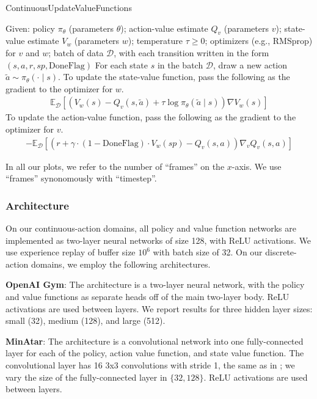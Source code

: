 \documentclass[twoside,11pt]{article}
\newcommand{\Ex}{\mathbb{E}}
\begin{document}
\begin{algorithm}
\caption{ContinuousUpdateValueFunctions}
\label{alg:continuous-value-update}
\begin{algorithmic}
    \State Given: policy $\pi_\theta$ (parameters $\theta$); action-value estimate $Q_v$ (parameters $v$); state-value estimate $V_w$ (parameters $w$); temperature $\tau \geq 0$; optimizers (e.g., RMSprop) for $v$ and $w$; batch of data $\mathcal{D}$, with each transition written in the form $(s, a, r, sp, \text{DoneFlag})$
    \State For each state $s$ in the batch $\mathcal{D}$, draw a new action $\tilde{a} \sim \pi_\theta(\cdot \mid s)$.
    \State To update the state-value function, pass the following as the gradient to the optimizer for $w$. 
    \begin{align*}
        \Ex_{\mathcal{D}}[(V_w(s) - Q_v(s, \tilde{a}) + \tau \log \pi_\theta (\tilde{a} \mid s)) \nabla V_w(s)]
    \end{align*}
    \State To update the action-value function, pass the following as the gradient to the optimizer for $v$. 
    \begin{align*}
        -\Ex_{\mathcal{D}}[(r + \gamma \cdot (1 - \text{DoneFlag})\cdot V_w(sp) - Q_v(s, a)) \nabla_v Q_v(s, a)]
    \end{align*}
\end{algorithmic}
\end{algorithm}

In all our plots, we refer to the number of ``frames'' on the $x$-axis. We use ``frames'' synonomously with ``timestep''. 

\subsubsection{Architecture}
On our continuous-action domains, all policy and value function networks are implemented as two-layer neural networks of size 128, with ReLU activations. We use experience replay of buffer size $10^6$ with batch size of 32. On our discrete-action domains, we employ the following architectures.

\textbf{OpenAI Gym}: The architecture is a two-layer neural network, with the policy and value functions as separate heads off of the main two-layer body. ReLU activations are used between layers. We report results for three hidden layer sizes: small (32), medium (128), and large (512).

\textbf{MinAtar}: The architecture is a convolutional network into one fully-connected layer for each of the policy, action value function, and state value function. The convolutional layer has 16 3x3 convolutions with stride 1, the same as in \citet{young2019minatar}; we vary the size of the fully-connected layer in $\{32, 128\}$. ReLU activations are used between layers. 
\end{document}
